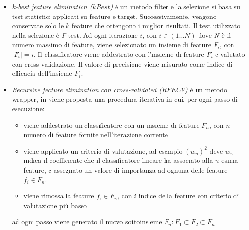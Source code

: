 \begin{itemize}
  \item \textit{$k$-best feature elimination ($kBest$)} è un metodo filter e la selezione si basa su test statistici applicati su feature e target. Successivamente, vengono conservate solo le $k$ feature che ottengono i miglior risultati. Il test utilizzato nella selezione è $F$-test. Ad ogni iterazione $i$, con $i \in (1 \dots N)$ dove $N$ è il numero massimo di feature, viene selezionato un insieme di feature $F_{i}$, con $|F_{i}|=i$. Il classificatore viene addestrato con l'insieme di feature $F_{i}$ e valutato con cross-validazione. Il valore di precisione viene misurato come indice di efficacia dell'insieme $F_{i}$.

  \item \textit{Recursive feature elimination con cross-validated ($RFECV$)} è un metodo wrapper, in \cite{weston2001feature} viene proposta una procedura iterativa in cui, per ogni passo di esecuzione:
  \begin{itemize}
    \item viene addestrato un classificatore con un insieme di feature $F_{n}$, con $n$ numero di feature fornite nell'iterazione corrente
    \item viene applicato un criterio di valutazione, ad esempio $(w_{n})^2$ dove $w_{n}$ indica il coefficiente che il classificatore lineare ha associato alla $n$-esima feature, e assegnato un valore di importanza ad ognuna delle feature $f_{i} \in F_{n}$.
    \item viene rimossa la feature $f_{i} \in F_{n}$, con $i$ indice della feature con criterio di valutazione più basso
  \end{itemize}
  ad ogni passo viene generato il nuovo sottoinsieme $F_{n} : F_{1} \subset F_{2} \subset F_{n}$
\end{itemize}

